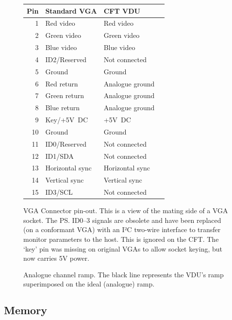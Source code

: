 \begin{figure}
  \centering
  \vspace{1em}\par

  \zebra
  \begin{tabular}{rlll}
    Pin & Standard VGA & CFT VDU \\
    \hline
    1  & Red video & Red video \\
    2  & Green video & Green video \\
    3  & Blue video & Blue video \\
    4  & ID2/Reserved & Not connected \\
    5  & Ground & Ground \\
    6  & Red return & Analogue ground \\
    7  & Green return & Analogue ground \\
    8  & Blue return & Analogue ground \\
    9  & Key/+5V~DC & +5V~DC \\
    10 & Ground & Ground \\
    11 & ID0/Reserved & Not connected \\
    12 & ID1/SDA & Not connected \\
    13 & Horizontal sync & Horizontal sync \\
    14 & Vertical sync & Vertical sync \\
    15 & ID3/SCL & Not connected \\
    \hline
  \end{tabular}
  \caption[VGA Connector Pin-Out]{\label{fig:vdu-vga-pinout}VGA Connector
    pin-out. This is a view of the mating side of a VGA socket. The \ps{ID0–3}
    signals are obsolete and have been replaced (on a conformant VGA) with an
    I²C two-wire interface to transfer monitor parameters to the host. This is
    ignored on the CFT. The ‘key’ pin was missing on original VGAs to allow
    socket keying, but now carries 5V power.}
\end{figure}

\begin{figure}
 \centering
 \caption[Analogue Channel Ramp]{\label{fig:vdu-analogue-ramp} Analogue channel
   ramp. The black line represents the VDU's ramp superimposed on the ideal
   (analogue) ramp.}
\end{figure}


\subsection{Memory}

